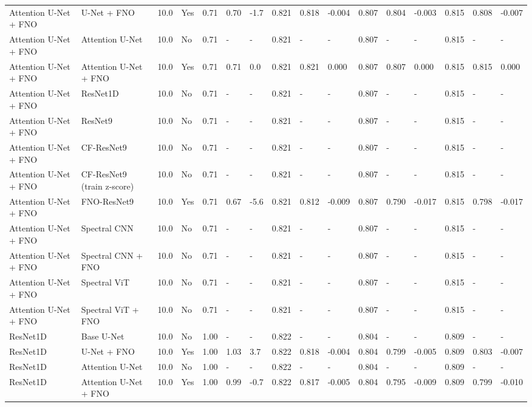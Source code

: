 \begin{longtable}{llllllllllllllll}
Attention U-Net + FNO & U-Net + FNO & 10.0 & Yes & 0.71 & 0.70 & -1.7 & 0.821 & 0.818 & -0.004 & 0.807 & 0.804 & -0.003 & 0.815 & 0.808 & -0.007 \\
Attention U-Net + FNO & Attention U-Net & 10.0 & No & 0.71 & - & - & 0.821 & - & - & 0.807 & - & - & 0.815 & - & - \\
Attention U-Net + FNO & Attention U-Net + FNO & 10.0 & Yes & 0.71 & 0.71 & 0.0 & 0.821 & 0.821 & 0.000 & 0.807 & 0.807 & 0.000 & 0.815 & 0.815 & 0.000 \\
Attention U-Net + FNO & ResNet1D & 10.0 & No & 0.71 & - & - & 0.821 & - & - & 0.807 & - & - & 0.815 & - & - \\
Attention U-Net + FNO & ResNet9 & 10.0 & No & 0.71 & - & - & 0.821 & - & - & 0.807 & - & - & 0.815 & - & - \\
Attention U-Net + FNO & CF-ResNet9 & 10.0 & No & 0.71 & - & - & 0.821 & - & - & 0.807 & - & - & 0.815 & - & - \\
Attention U-Net + FNO & CF-ResNet9 (train z-score) & 10.0 & No & 0.71 & - & - & 0.821 & - & - & 0.807 & - & - & 0.815 & - & - \\
Attention U-Net + FNO & FNO-ResNet9 & 10.0 & Yes & 0.71 & 0.67 & -5.6 & 0.821 & 0.812 & -0.009 & 0.807 & 0.790 & -0.017 & 0.815 & 0.798 & -0.017 \\
Attention U-Net + FNO & Spectral CNN & 10.0 & No & 0.71 & - & - & 0.821 & - & - & 0.807 & - & - & 0.815 & - & - \\
Attention U-Net + FNO & Spectral CNN + FNO & 10.0 & No & 0.71 & - & - & 0.821 & - & - & 0.807 & - & - & 0.815 & - & - \\
Attention U-Net + FNO & Spectral ViT & 10.0 & No & 0.71 & - & - & 0.821 & - & - & 0.807 & - & - & 0.815 & - & - \\
Attention U-Net + FNO & Spectral ViT + FNO & 10.0 & No & 0.71 & - & - & 0.821 & - & - & 0.807 & - & - & 0.815 & - & - \\
ResNet1D & Base U-Net & 10.0 & No & 1.00 & - & - & 0.822 & - & - & 0.804 & - & - & 0.809 & - & - \\
ResNet1D & U-Net + FNO & 10.0 & Yes & 1.00 & 1.03 & 3.7 & 0.822 & 0.818 & -0.004 & 0.804 & 0.799 & -0.005 & 0.809 & 0.803 & -0.007 \\
ResNet1D & Attention U-Net & 10.0 & No & 1.00 & - & - & 0.822 & - & - & 0.804 & - & - & 0.809 & - & - \\
ResNet1D & Attention U-Net + FNO & 10.0 & Yes & 1.00 & 0.99 & -0.7 & 0.822 & 0.817 & -0.005 & 0.804 & 0.795 & -0.009 & 0.809 & 0.799 & -0.010 \\

\end{longtable}
